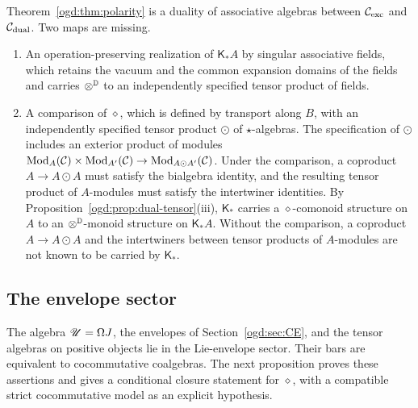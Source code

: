\begin{openproblem}\label{ogd:op:realization}
Theorem~\ref{ogd:thm:polarity} is a duality of associative algebras between \(\mathcal C_{\mathrm{exc}}\) and \(\mathcal C_{\mathrm{dual}}\).
Two maps are missing.
\begin{enumerate}
\item An operation-preserving realization of \(\mathsf K_*A\) by singular associative fields, which retains the vacuum and the common expansion domains of the fields and carries \(\mathbin{\otimes^{\mathbb D}}\) to an independently specified tensor product of fields.
\item A comparison of \(\diamond\), which is defined by transport along \(B\), with an independently specified tensor product \(\odot\) of \(\star\)-algebras.
The specification of \(\odot\) includes an exterior product of modules \(\operatorname{Mod}_A(\mathcal C)\times\operatorname{Mod}_{A'}(\mathcal C)\to\operatorname{Mod}_{A\odot A'}(\mathcal C)\).
Under the comparison, a coproduct \(A\to A\odot A\) must satisfy the bialgebra identity, and the resulting tensor product of \(A\)-modules must satisfy the intertwiner identities.
By Proposition~\ref{ogd:prop:dual-tensor}(iii), \(\mathsf K_*\) carries a \(\diamond\)-comonoid structure on \(A\) to an \(\mathbin{\otimes^{\mathbb D}}\)-monoid structure on \(\mathsf K_*A\).
Without the comparison, a coproduct \(A\to A\odot A\) and the intertwiners between tensor products of \(A\)-modules are not known to be carried by \(\mathsf K_*\).
\end{enumerate}
\end{openproblem}

\subsection{The envelope sector}
\label{ogd:sec:envelope-sector}

The algebra \(\mathscr U=\Omega J\), the envelopes of Section~\ref{ogd:sec:CE}, and the tensor algebras on positive objects lie in the Lie-envelope sector.
Their bars are equivalent to cocommutative coalgebras.
The next proposition proves these assertions and gives a conditional closure statement for \(\diamond\), with a compatible strict cocommutative model as an explicit hypothesis.

